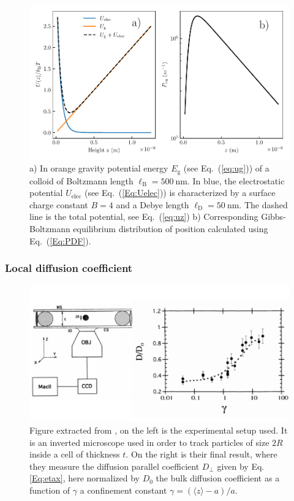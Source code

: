 \begin{figure}[h]
	\centering
	\includegraphics{02_body/chapter3/images/potential/potential_exemple.pdf}
	\caption{ a) In orange gravity potential energy $E_\mathrm{g}$ (see Eq.~(\ref{eq:ug})) of a colloid of Boltzmann length $\ell_\mathrm{B} = 500 ~ \mathrm{nm} $. In blue, the electrostatic potential $U_\mathrm{elec}$ (see Eq.~(\ref{Eq:Uelec})) is characterized by a surface charge constant $B = 4$ and a Debye length $\ell_\mathrm{D} = 50 ~ \mathrm{nm}$. The dashed line is the total potential, see Eq.~(\ref{eq:uz}) b) Corresponding Gibbs-Boltzmann equilibrium distribution of position calculated using Eq.~(\ref{Eq:PDF}).}
	\label{Fig:potential}
\end{figure}

\subsubsection{Local diffusion coefficient}

\begin{figure}
	\centering
	\includegraphics{02_body/chapter1/image/libchaber.pdf}
	\caption{Figure extracted from \cite{faucheux_confined_1994}, on the left is the experimental setup used. It is an inverted microscope used in order to track particles of size $2R$ inside a cell of thickness $t$. On the right is their final result, where they measure the diffusion parallel coefficient $D_\bot$ given by Eq.\ref{Eq:etax}, here normalized by $D_0$ the bulk diffusion coefficient as a function of  $\gamma$ a confinement constant $\gamma = (\langle z \rangle -a)/a$. }
	\label{fig:libchaber}
\end{figure}


